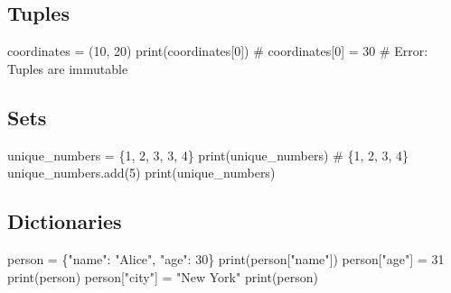 \documentclass[
  letterpaper,
  DIV=11,
  numbers=noendperiod]{scrreprt}
\newenvironment{Shaded}{\begin{snugshade}}{\end{snugshade}}
\newcommand{\BuiltInTok}[1]{\textcolor[rgb]{0.00,0.23,0.31}{#1}}
\newcommand{\CommentTok}[1]{\textcolor[rgb]{0.37,0.37,0.37}{#1}}
\newcommand{\DecValTok}[1]{\textcolor[rgb]{0.68,0.00,0.00}{#1}}
\newcommand{\NormalTok}[1]{\textcolor[rgb]{0.00,0.23,0.31}{#1}}
\newcommand{\OperatorTok}[1]{\textcolor[rgb]{0.37,0.37,0.37}{#1}}
\newcommand{\StringTok}[1]{\textcolor[rgb]{0.13,0.47,0.30}{#1}}
\begin{document}
\subsection{Tuples}\label{tuples}

\begin{Shaded}
\begin{Highlighting}[]
\NormalTok{coordinates }\OperatorTok{=}\NormalTok{ (}\DecValTok{10}\NormalTok{, }\DecValTok{20}\NormalTok{)}
\BuiltInTok{print}\NormalTok{(coordinates[}\DecValTok{0}\NormalTok{])}
\CommentTok{\# coordinates[0] = 30  \# Error: Tuples are immutable}
\end{Highlighting}
\end{Shaded}

\subsection{Sets}\label{sets}

\begin{Shaded}
\begin{Highlighting}[]
\NormalTok{unique\_numbers }\OperatorTok{=}\NormalTok{ \{}\DecValTok{1}\NormalTok{, }\DecValTok{2}\NormalTok{, }\DecValTok{3}\NormalTok{, }\DecValTok{3}\NormalTok{, }\DecValTok{4}\NormalTok{\}}
\BuiltInTok{print}\NormalTok{(unique\_numbers)  }\CommentTok{\# \{1, 2, 3, 4\}}
\NormalTok{unique\_numbers.add(}\DecValTok{5}\NormalTok{)}
\BuiltInTok{print}\NormalTok{(unique\_numbers)}
\end{Highlighting}
\end{Shaded}

\subsection{Dictionaries}\label{dictionaries-1}

\begin{Shaded}
\begin{Highlighting}[]
\NormalTok{person }\OperatorTok{=}\NormalTok{ \{}\StringTok{"name"}\NormalTok{: }\StringTok{"Alice"}\NormalTok{, }\StringTok{"age"}\NormalTok{: }\DecValTok{30}\NormalTok{\}}
\BuiltInTok{print}\NormalTok{(person[}\StringTok{"name"}\NormalTok{])}
\NormalTok{person[}\StringTok{"age"}\NormalTok{] }\OperatorTok{=} \DecValTok{31}
\BuiltInTok{print}\NormalTok{(person)}
\NormalTok{person[}\StringTok{"city"}\NormalTok{] }\OperatorTok{=} \StringTok{"New York"}
\BuiltInTok{print}\NormalTok{(person)}
\end{Highlighting}
\end{Shaded}
\end{document}

